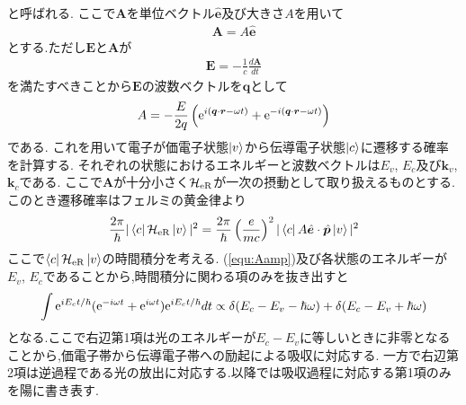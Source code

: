 \documentclass[uplatex,a4j,11pt,dvipdfmx]{jsarticle}
\begin{document}
と呼ばれる.
ここで$\bm A$を単位ベクトル$\hat{\bm e}$及び大きさ$A$を用いて
\begin{align}
  {\bm A}=A\hat{\bm e}
\end{align}
とする.ただし${\bm E}$と${\bm A}$が
\begin{align}
  {\bm E}=-\frac{1}{c}\frac{d{\bm A}}{dt}
\end{align}
を満たすべきことから$\bm E$の波数ベクトルを$\bm q$として
\begin{align}
  \label{equ:Aamp}
  A=-\frac{E}{2q}\left({\rm e}^{i({\bm q}\cdot{\bm r}-\omega t)}+{\rm e}^{-i({\bm q}\cdot{\bm r}-\omega t)}\right)
\end{align}
である.
これを用いて電子が価電子状態$\ket{v}$から伝導電子状態$\ket{c}$に遷移する確率を計算する.
それぞれの状態におけるエネルギーと波数ベクトルは$E_v$, $E_c$及び${\bm k}_v$, ${\bm k}_c$である.
ここで$\bm A$が十分小さく$\mathcal{H}_{\rm eR}$が一次の摂動として取り扱えるものとする.
このとき遷移確率はフェルミの黄金律より
\begin{align}
  \label{equ:fermi_golden}
  \frac{2\pi}{\hbar}|\bra{c}\mathcal{H}_{\rm eR}\ket{v}|^2=\frac{2\pi}{\hbar}\left(\frac{e}{mc}\right)^2|\bra{c}A\hat{\bm e}\cdot\hat{\bm p}\ket{v}|^2
\end{align}
ここで$\bra{c}\mathcal{H}_{\rm eR}\ket{v}$の時間積分を考える.
(\ref{equ:Aamp})及び各状態のエネルギーが$E_v$, $E_c$であることから,時間積分に関わる項のみを抜き出すと
\begin{align}
  \int{\rm e}^{iE_ct/\hbar}({\rm e}^{-i\omega t}+{\rm e}^{i\omega t}){\rm e}^{iE_ct/\hbar}dt
  \propto\delta(E_c-E_v-\hbar\omega)+\delta(E_c-E_v+\hbar\omega)
\end{align}
となる.ここで右辺第1項は光のエネルギーが$E_c-E_v$に等しいときに非零となることから,価電子帯から伝導電子帯への励起による吸収に対応する.
一方で右辺第2項は逆過程である光の放出に対応する.以降では吸収過程に対応する第1項のみを陽に書き表す.
\end{document}
